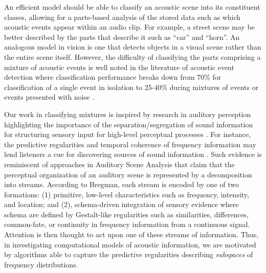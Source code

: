 An efficient model should be able to classify an acoustic scene into its constituent classes, allowing for a parts-based analysis of the stored data such as which acoustic events appear within an audio clip.  For example, a street scene may be better described by the parts that describe it such as ``car'' and ``horn''.  An analogous model in vision is one that detects objects in a visual scene rather than the entire scene itself.  However, the difficulty of classifying the parts comprising a mixture of acoustic events is well noted in the literature of acoustic event detection where classification performance breaks down from 70\% for classification of a single event in isolation to 25-40\% during mixtures of events or events presented with noise \cite{Temko2007}. 


Our work in classifying mixtures is inspired by research in auditory perception highlighting the importance of the separation/segregation of sound information for structuring sensory input for high-level perceptual processes \cite{Winkler2009a,Teki2011a}.  For instance, the predictive regularities and temporal coherence of frequency information may lend listeners a cue for discovering sources of sound information \cite{Winkler2009a, Shamma2011}.  Such evidence is reminiscent of approaches in Auditory Scene Analysis \cite{Bregman1990} that claim that the perceptual organization of an auditory scene is represented by a decomposition into streams.  According to Bregman, each stream is encoded by one of two formations: (1) primitive, low-level characteristics such as frequency, intensity, and location; and (2), schema-driven integration of sensory evidence where schema are defined by Gestalt-like regularities such as similarities, differences, common-fate, or continuity in frequency information from a continuous signal.  Attention is then thought to act upon one of these streams of information.  Thus, in investigating computational models of acoustic information, we are motivated by algorithms able to capture the predictive regularities describing \textit{subspaces} of frequency distributions. 


